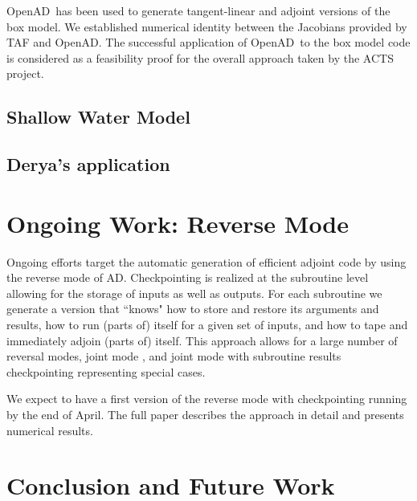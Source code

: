 \documentclass[acmtocl,acmnow]{acmtrans2m}
\newcommand{\OpenAD}{OpenAD}
\begin{document}
\OpenAD\ has been used to generate tangent-linear and 
adjoint versions of the box model. We established numerical identity between
the Jacobians provided by TAF and \OpenAD.
The successful 
application of \OpenAD\ to the box model code is considered as a feasibility 
proof for the overall approach taken by the ACTS project.  
\subsection{Shallow Water Model}
\subsection{Derya's application}

\section*{Ongoing Work: Reverse Mode}

Ongoing efforts target the automatic generation of efficient adjoint
code by using the reverse mode of AD. Checkpointing is realized at the 
subroutine level allowing for the storage of inputs as well as outputs. 
For each subroutine we generate a version that ``knows" how to store and 
restore its arguments and results, how to run (parts of) itself for a given
set of inputs, and how to tape and immediately adjoin (parts of) itself.
This approach allows for a large number of reversal modes, 
joint mode \cite{Gri00}, and joint mode with subroutine results checkpointing 
representing special cases. 

We expect to have a first version of the reverse mode with checkpointing
running by the end of April. The full paper describes the approach in detail 
and presents numerical results.

\section*{Conclusion and Future Work}
\end{document}
